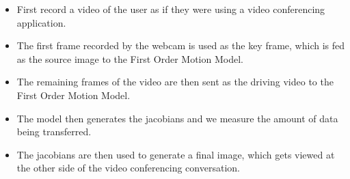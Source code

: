 \begin{itemize}
    \item First record a video of the user as if they were using a video conferencing application. 
    \item The first frame recorded by the webcam is used as the key frame, which is fed as the source image to the First Order Motion Model.
    \item The remaining frames of the video are then sent as the driving video to the First Order Motion Model.
    \item The model then generates the jacobians and we measure the amount of data being transferred.
    \item The jacobians are then used to generate a final image, which gets viewed at the other side of the video conferencing conversation.
\end{itemize}